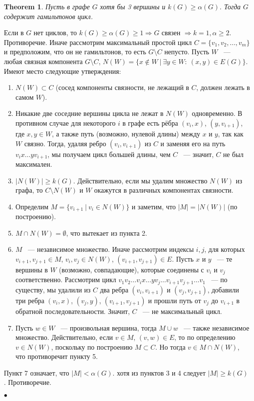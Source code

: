 \documentclass[a4paper]{article}
\theoremstyle{plain}
\newtheorem{theorem}{Theorem}
\theoremstyle{remark}
\theoremstyle{definition}
\renewenvironment{proof}{{\bfseries Proof}}{$\bullet$}
\begin{document}
\begin{theorem} Пусть в графе $G$ хотя бы 3 вершины и $k(G)\geq\alpha(G)$. Тогда $G$ содержит гамильтонов цикл.
\end{theorem}
\begin{proof} Если в $G$ нет циклов, то $k(G)\geq\alpha(G)\geq 1 \Rightarrow G$ связен $\Rightarrow k=1, \alpha\geq 2$. Противоречие. Иначе рассмотрим максимальный простой цикл $C = \{v_1,v_2,\dots,v_m\}$ и предположим, что он не гамильтонов, то есть $G\setminus C$ непусто. Пусть $W$ ~--- любая связная компонента $G\setminus C$, $N(W) = \{x\notin W\: |\:\exists y \in W: \: (x,y)\in E(G)\}$. Имеют место следующие утверждения:
\begin{enumerate}
\item $N(W)\subset C$ (сосед компоненты связности, не лежащий в $C$, должен лежать в самом $W$). 
\item Никакие две соседние вершины цикла не лежат в $N(W)$ одновременно. В противном случае для некоторого $i$ в графе есть рёбра $(v_i,x)$, $(y,v_{i+1})$, где $x,y \in W$, а также путь (возможно, нулевой длины) между $x$ и $y$, так как $W$ связно. Тогда, удаляя ребро $(v_i,v_{i+1})$ из $C$ и заменяя его на путь $v_ix\dots yv_{i+1}$, мы получаем цикл большей длины, чем $C$ ~--- значит, $C$ не был максимален.
\item $|N(W)|\geq k(G)$. Действительно, если мы удалим множество $N(W)$ из графа, то $C\setminus N(W)$ и $W$ окажутся в различных компонентах связности.
\item Определим $M = \{v_{i+1}\:|\: v_i\in N(W)\}$ и заметим, что $|M|=|N(W)|$ (по построению).
\item $M \cap N(W) = \emptyset$, что вытекает из пункта 2.
\item $M$ ~--- независимое множество. Иначе рассмотрим индексы $i,j$, для которых $v_{i+1},v_{j+1}\in M$, $v_i,v_j\in N(W)$, $(v_{i+1},v_{j+1})\in E$. Пусть $x$ и $y$ ~--- те вершины в $W$ (возможно, совпадающие), которые соединены с $v_i$ и $v_j$ соответственно. Рассмотрим цикл $v_1v_2\dots v_i x\dots y v_j \dots v_{i+1}v_{j+1}\dots v_1$ ~--- по существу, мы удалили из $C$ два ребра $(v_i,v_{i+1})$ и $(v_j,v_{j+1})$, добавили три ребра $(v_i,x)$, $(v_j,y)$, $(v_{i+1},v_{j+1})$ и прошли путь от $v_j$ до $v_{i+1}$ в обратной последовательности. Значит, $C$ ~--- не максимальный цикл.
\item Пусть $w\in W$ ~--- произвольная вершина, тогда $M\cup w$ ~--- также независимое множество. Действительно, если $v\in M$, $(v,w)\in E$, то по определению $v\in N(W)$, поскольку по построению $M\subset C$. Но тогда $v\in M\cap N(W)$, что противоречит пункту 5.
\end{enumerate}
Пункт 7 означает, что $|M|<\alpha(G)$. хотя из пунктов 3 и 4 следует $|M|\geq k(G)$. Противоречие.

\end{proof}
\end{document}

